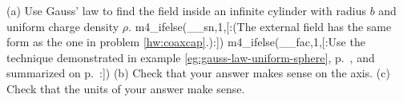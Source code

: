 (a) Use Gauss' law to find the field inside an
        infinite cylinder with radius $b$ and uniform
        charge density $\rho$. 
m4_ifelse(__sn,1,[:(The external field has the same form as
        the one in problem \ref{hw:coaxcap}.):])%
m4_ifelse(__fac,1,[:Use the technique demonstrated in example \ref{eg:gauss-law-uniform-sphere},
        p.~\pageref{eg:gauss-law-uniform-sphere}, and
        summarized on p.~\pageref{summary-unknown-field-gauss}:])%
\answercheck\hwendpart
(b) Check that your answer makes sense on the axis.\hwendpart
(c) Check that the units of your answer make sense.

